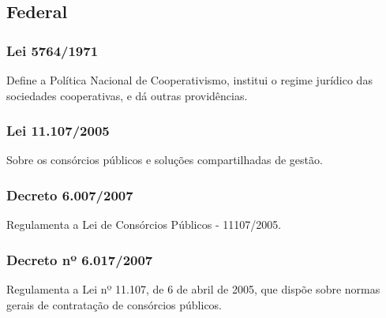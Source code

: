 \begin{subapend}
	\subsection{Federal}
	\begin{subsubapend}
		\item \subsubsection{Lei 5764/1971}
		Define a Política Nacional de Cooperativismo, institui o regime jurídico das sociedades cooperativas, e dá outras providências.
		\subsubsection{Lei 11.107/2005}
		Sobre os consórcios públicos e soluções compartilhadas de gestão.
		\subsubsection{Decreto 6.007/2007}
		Regulamenta a Lei de Consórcios Públicos - 11107/2005.
		\subsubsection{Decreto nº 6.017/2007}
		Regulamenta a Lei nº 11.107, de 6 de abril de 2005, que dispõe sobre normas gerais de contratação de consórcios públicos.
	\end{subsubapend}
\end{subapend}


